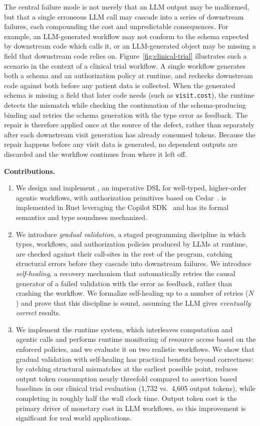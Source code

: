 The central failure mode is not merely that an LLM output may be
malformed, but that a single erroneous LLM call may cascade into a series of downstream failures,
each compounding the cost and unpredictable consequences. 
For example, an LLM-generated workflow may
not conform to the schema expected by downstream code which calls it,
or an LLM-generated object may be missing a field that downstream code relies on.
Figure~\ref{fig:clinical-trial} illustrates such a scenario in the context of a
clinical trial workflow. A single workflow generates both a schema and an authorization
policy at runtime, and \pact rechecks downstream code against
both before any patient data is collected. When the generated
schema is missing a field that later code needs (such as
\texttt{visit.cost}), the runtime detects the mismatch while checking
the continuation of the schema-producing binding and retries the
schema generation with the type error as feedback. The repair is
therefore applied once at the source of the defect, rather than
separately after each downstream visit generation has already consumed
tokens. Because the repair happens before any visit data is generated, no dependent
outputs are discarded and the workflow continues from where it
left off.

\textbf{Contributions.}
\begin{enumerate}
    \item We design and implement \pact{}, an imperative DSL for well-typed, higher-order
agentic workflows, with authorization primitives based on Cedar~\cite{cutler2024cedar}.
\pact{} is implemented in Rust leveraging the Copilot SDK~\cite{CopilotSDKRust2026} and has its formal semantics and type soundness mechanized.
    \item We introduce \emph{gradual validation}, a staged programming
discipline in which types, workflows, and authorization policies
produced by LLMs at runtime, are checked against their call-sites in the rest of the
program, catching structural errors before they cascade into downstream failures. 
We introduce \emph{self-healing}, a recovery mechanism that automatically retries the causal generator of a failed validation with the error as feedback, rather than crashing the workflow.
    We formalize self-healing up to a number of retries ($N$) and prove that this discipline is 
    sound, assuming the LLM gives \emph{eventually correct} results.
    \item We implement the \pact{} runtime system, which interleaves computation and agentic calls and performs runtime monitoring of resource
    access based on the enforced policies, and we evaluate it on two realistic
    workflows. We show that gradual validation with self-healing has practical
    benefits beyond correctness: by catching structural mismatches at the
    earliest possible point, \pact{} reduces output token consumption nearly
    threefold compared to assertion based baselines in our clinical trial
    evaluation (1{,}732 vs.\ 4{,}605 output tokens), while completing in roughly
    half the wall clock time. Output token cost is the primary driver of
    monetary cost in LLM workflows, so this improvement is significant for real
    world applications.
\end{enumerate}

